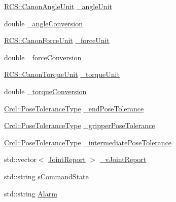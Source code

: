 \begin{DoxyCompactItemize}
\item 
\hyperlink{namespaceRCS_ad07ee9a15612cae458796cf946e36410}{R\-C\-S\-::\-Canon\-Angle\-Unit} \hyperlink{structCrcl_1_1CrclStatus_a089adf5239cb75e9bd966d94da2f9b18}{\-\_\-angle\-Unit}
\item 
double \hyperlink{structCrcl_1_1CrclStatus_a107704fe77ba28d4d4d7e6646160df86}{\-\_\-angle\-Conversion}
\item 
\hyperlink{namespaceRCS_a7ab3ac05af337215785442dc8570c00f}{R\-C\-S\-::\-Canon\-Force\-Unit} \hyperlink{structCrcl_1_1CrclStatus_a4c189e961e876682b51f2c2e12aa032a}{\-\_\-force\-Unit}
\item 
double \hyperlink{structCrcl_1_1CrclStatus_ae7fa1a8cf85b8c0968d747dd2b4d8b89}{\-\_\-force\-Conversion}
\item 
\hyperlink{namespaceRCS_aad43ee626dc2b93364a9276cd0190b38}{R\-C\-S\-::\-Canon\-Torque\-Unit} \hyperlink{structCrcl_1_1CrclStatus_a51082e4b4a5fa27a8244d1ea77a9fd40}{\-\_\-torque\-Unit}
\item 
double \hyperlink{structCrcl_1_1CrclStatus_a1dcd8215508cb4af98b647a0b8c2bf98}{\-\_\-torque\-Conversion}
\item 
\hyperlink{namespaceCrcl_ac805071e16341b82d4fa4e12b7f3ac6f}{Crcl\-::\-Pose\-Tolerance\-Type} \hyperlink{structCrcl_1_1CrclStatus_a3329553459fd87df256119326cfd703e}{\-\_\-end\-Pose\-Tolerance}
\item 
\hyperlink{namespaceCrcl_ac805071e16341b82d4fa4e12b7f3ac6f}{Crcl\-::\-Pose\-Tolerance\-Type} \hyperlink{structCrcl_1_1CrclStatus_a6e3526617c935d84b1f3d9c4ec9133a0}{\-\_\-gripper\-Pose\-Tolerance}
\item 
\hyperlink{namespaceCrcl_ac805071e16341b82d4fa4e12b7f3ac6f}{Crcl\-::\-Pose\-Tolerance\-Type} \hyperlink{structCrcl_1_1CrclStatus_a40458b87a045e9a1ef630334037f37cd}{\-\_\-intermediate\-Pose\-Tolerance}
\item 
std\-::vector$<$ \hyperlink{structCrcl_1_1JointReport}{Joint\-Report} $>$ \hyperlink{structCrcl_1_1CrclStatus_aa26e119cf006f7f9c0da64aa4944fc1f}{\-\_\-v\-Joint\-Report}
\item 
std\-::string \hyperlink{structCrcl_1_1CrclStatus_af485e1524d7eb0f8108fabeb9ae371f8}{s\-Command\-State}
\item 
std\-::string \hyperlink{structCrcl_1_1CrclStatus_a0cd3ee396ed753479bd03ec30809db22}{Alarm}
\end{DoxyCompactItemize}


